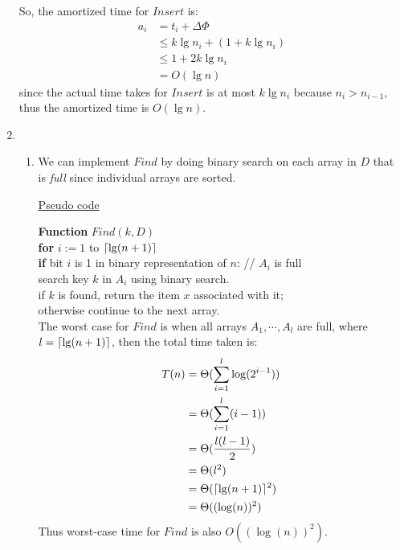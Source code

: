 \documentclass[11pt]{article}
\DeclarePairedDelimiter\ceil{\lceil}{\rceil}
\begin{document}
\begin{enumerate}
  So, the amortized time for $Insert$ is:
  \begin{align}
    a_i &= t_i + \Delta\Phi\\
    &\leq k\lg n_i + (1 + k\lg n_i)\\
    &\leq 1 + 2k\lg n_i\\
    &= O(\lg n)
  \end{align}
  since the actual time takes for $Insert$ is at most $k\lg n_i$
  because $n_i > n_{i-1}$, thus the amortized time is $O(\lg n)$.

\item %
  \begin{enumerate}
  \item 
    We can implement $Find$ by doing binary search on each array in
    $D$ that is \emph{full} since individual arrays are sorted.

    \underline{Pseudo code}

    \textbf{Function} $Find(k,D)$\\
    \-\hspace{2em} \textbf{for} $i := 1$ to $\ceil{\lg (n+1)}$\\
    \-\hspace{4em} \textbf{if} bit $i$ is 1 in binary representation
    of $n$: // $A_i$ is full\\
    \-\hspace{6em} search key $k$ in $A_i$ using binary search.\\
    \-\hspace{6em} if $k$ is found, return the item $x$ associated
    with it;\\ 
    \-\hspace{6em} otherwise continue to the next array.\\

  The worst case for $Find$ is when all arrays $A_1, \cdots, A_l$ are
  full, where $l=\ceil{\lg (n+1)}$, then the total time taken is:
  \begin{align}
    T(n) &= \Theta(\sum_{i=1}^{l} \log (2^{i-1}))\\
    &= \Theta(\sum_{i=1}^{l} (i-1))\\
    &= \Theta(\frac{l(l-1)}{2})\\
    &= \Theta(l^2)\\
    &= \Theta(\ceil{\lg (n+1)}^2)\\
    &= \Theta((\log(n))^2)
  \end{align}
  Thus worst-case time for $Find$ is also $O((\log(n))^2)$.


\end{enumerate}
\end{enumerate}
\end{document}
